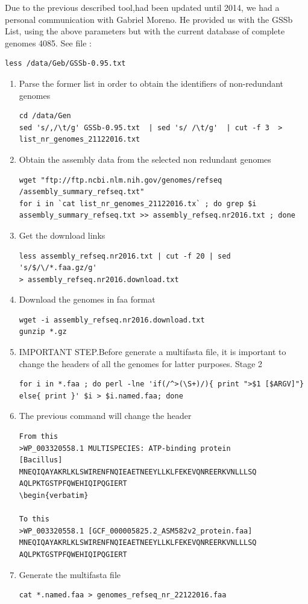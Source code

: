 \documentclass[12pt]{report}
\begin{document}
Due to the previous described tool,had been updated until 2014, we had a personal communication with Gabriel Moreno. He provided us with the  GSSb List, using the above parameters but with the current database of complete genomes 4085. See file :
\begin{verbatim}
less /data/Geb/GSSb-0.95.txt
\end{verbatim}
\begin{enumerate} 
\item Parse the former list in order to obtain the identifiers of non-redundant genomes
\begin{verbatim}
cd /data/Gen
sed 's/,/\t/g' GSSb-0.95.txt  | sed 's/ /\t/g'  | cut -f 3  > 
list_nr_genomes_21122016.txt
\end{verbatim}
\item Obtain the assembly data from the selected non redundant genomes 
\begin{verbatim}
wget "ftp://ftp.ncbi.nlm.nih.gov/genomes/refseq
/assembly_summary_refseq.txt" 
for i in `cat list_nr_genomes_21122016.tx` ; do grep $i 
assembly_summary_refseq.txt >> assembly_refseq.nr2016.txt ; done
\end{verbatim}
\item Get the download links 
\begin{verbatim}
less assembly_refseq.nr2016.txt | cut -f 20 | sed 's/$/\/*.faa.gz/g' 
> assembly_refseq.nr2016.download.txt
\end{verbatim}
\item Download the genomes in faa format  
\begin{verbatim}
wget -i assembly_refseq.nr2016.download.txt
gunzip *.gz 
\end{verbatim}
\item IMPORTANT STEP.Before generate a multifasta file, it is important to change the headers of all the genomes for latter purposes. Stage 2
\begin{verbatim}
for i in *.faa ; do perl -lne 'if(/^>(\S+)/){ print ">$1 [$ARGV]"} 
else{ print }' $i > $i.named.faa; done
\end{verbatim}
\item The previous command  will change the header  
\begin{verbatim}
From this 
>WP_003320558.1 MULTISPECIES: ATP-binding protein 
[Bacillus]
MNEQIQAYAKRLKLSWIRENFNQIEAETNEEYLLKLFEKEVQNREERKVNLLLSQ
AQLPKTGSTPFQWEHIQIPQGIERT
\begin{verbatim}

To this 
>WP_003320558.1 [GCF_000005825.2_ASM582v2_protein.faa]
MNEQIQAYAKRLKLSWIRENFNQIEAETNEEYLLKLFEKEVQNREERKVNLLLSQ
AQLPKTGSTPFQWEHIQIPQGIERT
\end{verbatim}
\item  Generate the multifasta file 
\begin{verbatim}
cat *.named.faa > genomes_refseq_nr_22122016.faa
\end{verbatim}


\end{enumerate}
\end{document}
